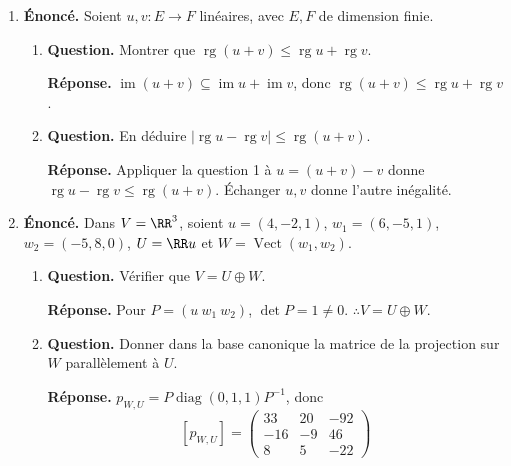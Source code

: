 \documentclass[12pt, a4paper]{article}
\begin{document}
\begin{enumerate}[label=7.\arabic*., start=68]
\begin{minipage}[t]{\linewidth}
\begin{enumerate}[\arabic*.]
\end{enumerate}
\end{minipage}

  \item \begin{minipage}[t]{\linewidth}\raggedright
\textbf{Énoncé.} Soient $u,v:E\to F$ linéaires, avec $E,F$ de dimension finie.

\begin{enumerate}[\arabic*.]
        \item \textbf{Question.} Montrer que $\operatorname{rg}(u+v)\leq\operatorname{rg}u+\operatorname{rg}v$.
\par\smallskip
\textbf{Réponse.} $\operatorname{im}(u+v)\subseteq\operatorname{im}u+\operatorname{im}v$, donc $\operatorname{rg}(u+v)\leq\operatorname{rg}u+\operatorname{rg}v$.

  \item \textbf{Question.} En déduire $|\operatorname{rg}u-\operatorname{rg}v|\leq\operatorname{rg}(u+v)$.
\par\smallskip
\textbf{Réponse.} Appliquer la question 1 à $u=(u+v)-v$ donne $\operatorname{rg}u-\operatorname{rg}v\leq\operatorname{rg}(u+v)$.
        Échanger $u,v$ donne l'autre inégalité.

\end{enumerate}
\end{minipage}

  \item \begin{minipage}[t]{\linewidth}\raggedright
\textbf{Énoncé.} Dans $V=\RR^3$, soient $u=(4,-2,1)$, $w_1=(6,-5,1)$, $w_2=(-5,8,0)$, $U=\RR u$ et $W=\operatorname{Vect}(w_1,w_2)$.

\begin{enumerate}[\arabic*.]
        \item \textbf{Question.} Vérifier que $V=U\oplus W$.
\par\smallskip
\textbf{Réponse.} Pour $P=(u\ w_1\ w_2)$, $\det P=1\neq0$.
        $\therefore V=U\oplus W$.

  \item \textbf{Question.} Donner dans la base canonique la matrice de la projection sur $W$ parallèlement à $U$.
\par\smallskip
\textbf{Réponse.} $p_{W,U}=P\operatorname{diag}(0,1,1)P^{-1}$, donc
        \[
          [p_{W,U}]=\begin{pmatrix}33&20&-92\\-16&-9&46\\8&5&-22\end{pmatrix}
        \]


\end{enumerate}
\end{minipage}
\end{enumerate}
\end{document}
